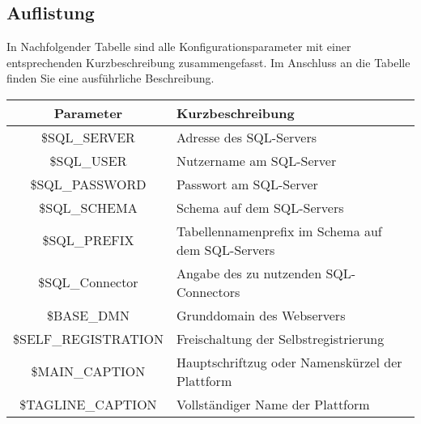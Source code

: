 \subsection{Auflistung}
In Nachfolgender Tabelle sind alle Konfigurationsparameter mit einer entsprechenden Kurzbeschreibung zusammengefasst. Im Anschluss an die Tabelle finden Sie eine ausführliche Beschreibung.
\begin{longtable}[H]{|c|l|}
		\hline
		\textbf{Parameter}   & \textbf{Kurzbeschreibung}                                                                                                     \\ \hline
		\$SQL\_SERVER        & Adresse des SQL-Servers                                                                                                     \\ \hline	
		\$SQL\_USER          & Nutzername am SQL-Server                                                                                                     \\ \hline	
		\$SQL\_PASSWORD      & Passwort am SQL-Server                                                                                                     \\ \hline	
		\$SQL\_SCHEMA        & Schema auf dem SQL-Servers                                                                                                     \\ \hline	
		\$SQL\_PREFIX        & Tabellennamenprefix im Schema auf dem SQL-Servers                                                                                                     \\ \hline	
		\$SQL\_Connector     & Angabe des zu nutzenden SQL-Connectors                                                                                                     \\ \hline	
		\$BASE\_DMN          & Grunddomain des Webservers                                                                                                     \\ \hline	
		\$SELF\_REGISTRATION & Freischaltung der Selbstregistrierung                                                                                                     \\ \hline	
		\$MAIN\_CAPTION      & Hauptschriftzug oder Namenskürzel der Plattform                                                                                                     \\ \hline	
		\$TAGLINE\_CAPTION   & Vollständiger Name der Plattform                                                                                                     \\ \hline	

\end{longtable}
